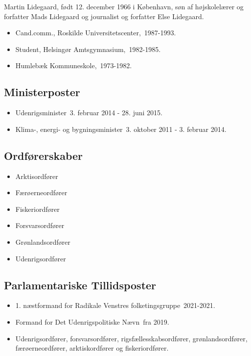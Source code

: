 \documentclass[11pt, a4paper]{awesome-cv}
\begin{document}
\makecvheader[R]
\makelettertitle
\begin{cvletter}
Martin Lidegaard, født 12. december 1966 i København, søn af højskolelærer og forfatter Mads Lidegaard og journalist og forfatter Else Lidegaard.

\begin{itemize}
\item Cand.comm., Roskilde Universitetscenter, 1987-1993.
\item Student, Helsingør Amtsgymnasium, 1982-1985.
\item Humlebæk Kommuneskole, 1973-1982.
\end{itemize}
\subsection*{Ministerposter}
\begin{itemize}
\item Udenrigsminister 3. februar 2014 - 28. juni 2015.
\item Klima-, energi- og bygningsminister 3. oktober 2011 - 3. februar 2014.
\end{itemize}
\subsection*{Ordførerskaber}
\begin{itemize}
\item Arktisordfører
\item Færøerneordfører
\item Fiskeriordfører
\item Forsvarsordfører
\item Grønlandsordfører
\item Udenrigsordfører
\end{itemize}
\subsection*{Parlamentariske Tillidsposter}
\begin{itemize}
\item 1. næstformand for Radikale Venstres folketingsgruppe 2021-2021.
\item Formand for Det Udenrigspolitiske Nævn fra 2019.
\item Udenrigsordfører, forsvarsordfører, rigsfællesskabsordfører, grønlandsordfører, færøerneordfører, arktiskordfører og fiskeriordfører.
\end{itemize}

\end{cvletter}
\end{document}
